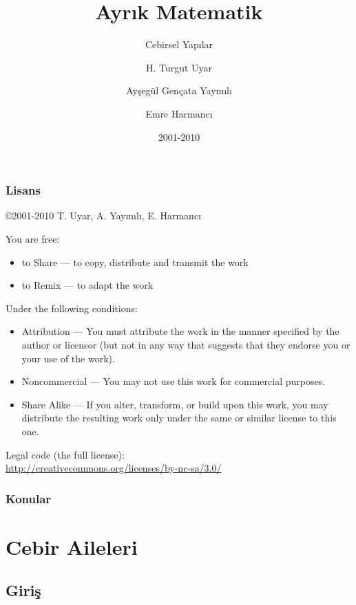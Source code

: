 \documentclass[dvipsnames]{beamer}
\title{Ayrık Matematik}
\subtitle{Cebirsel Yapılar}
\author{H. Turgut Uyar \and Ayşegül Gençata Yayımlı \and Emre Harmancı}
\date{2001-2010}
\theoremstyle{definition}
\theoremstyle{example}
\theoremstyle{plain}
\begin{document}
\begin{frame}
  \titlepage
\end{frame}

\begin{frame}
  \frametitle{Lisans}

  \hfill
  \copyright 2001-2010 T. Uyar, A. Yayımlı, E. Harmancı

  \vfill
  \begin{tiny}
    You are free:
    \begin{itemize}
      \item to Share — to copy, distribute and transmit the work
      \item to Remix — to adapt the work
    \end{itemize}

    Under the following conditions:
    \begin{itemize}
      \item Attribution — You must attribute the work in the manner specified by
        the author or licensor (but not in any way that suggests that they
        endorse you or your use of the work).

      \item Noncommercial — You may not use this work for commercial purposes.

      \item Share Alike — If you alter, transform, or build upon this work, you
        may distribute the resulting work only under the same or similar license
        to this one.
    \end{itemize}
  \end{tiny}

  \vfill
  Legal code (the full license):\\
  \url{http://creativecommons.org/licenses/by-nc-sa/3.0/}
\end{frame}

\begin{frame}
  \frametitle{Konular}
  \tableofcontents
\end{frame}

\section{Cebir Aileleri}

\subsection{Giriş}
\end{document}
